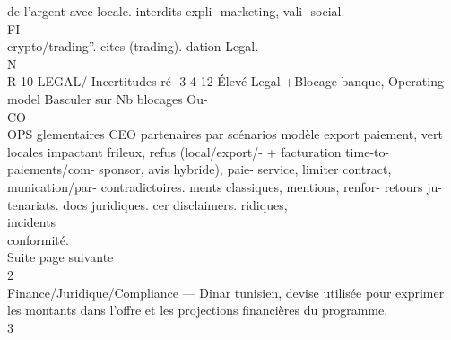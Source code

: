 \documentclass[12pt,landscape,a4paper]{article}
\begin{document}
de l’argent avec                       locale.           interdits expli- marketing, vali- social.\\
\vspace{0.5em}
\vspace{0.5em}
\vspace{0.5em}
\vspace{0.5em}
FI\\
crypto/trading”.                                         cites (trading). dation Legal.\\
\vspace{0.5em}
\vspace{0.5em}
\vspace{0.5em}
\vspace{0.5em}
N\\
R-10       LEGAL/   Incertitudes ré- 3 4 12 Élevé Legal +Blocage banque, Operating model Basculer         sur Nb blocages Ou-\\
\vspace{0.5em}
\vspace{0.5em}
\vspace{0.5em}
\vspace{0.5em}
CO\\
OPS      glementaires                  CEO    partenaires       par     scénarios modèle export paiement,          vert\\
locales impactant                    frileux,    refus (local/export/- +      facturation time-to-\\
paiements/com-                       sponsor,     avis hybride), paie- service, limiter contract,\\
munication/par-                      contradictoires. ments classiques, mentions, renfor- retours     ju-\\
tenariats.                                             docs juridiques. cer disclaimers. ridiques,\\
incidents\\
conformité.\\
Suite page suivante\\
\vspace{0.5em}
\vspace{0.5em}
\vspace{0.5em}
\vspace{0.5em}
2\\
Finance/Juridique/Compliance — Dinar tunisien, devise utilisée pour exprimer les montants dans l’offre et les projections financières du programme.\\
3\\
\end{document}
